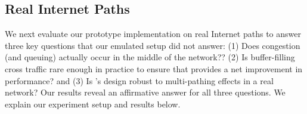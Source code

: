 %

\subsection{Real Internet Paths}\label{s:eval:realworld}




We next evaluate our prototype implementation on real Internet paths to answer three key questions that our emulated setup did not answer: (1) Does congestion (and queuing) actually occur in the middle of the network?? (2) Is buffer-filling cross traffic rare enough in practice to ensure that \name provides a net improvement in performance? and (3) Is \name's design robust to multi-pathing effects in a real network?  
Our results reveal an affirmative answer for all three questions. We explain our experiment setup and results below. 


